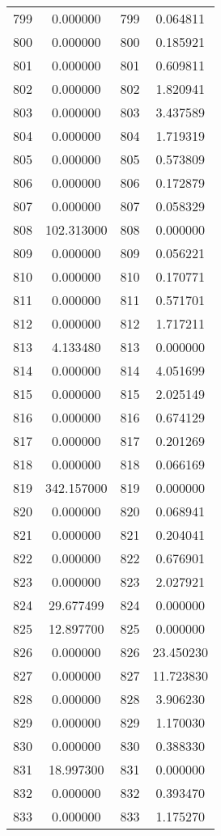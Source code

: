 \documentclass[12pt]{article}
\begin{document}
\begin{longtable}{@{}cccc@{}}
799 & 0.000000 & 799 & 0.064811 \\
800 & 0.000000 & 800 & 0.185921 \\
801 & 0.000000 & 801 & 0.609811 \\
802 & 0.000000 & 802 & 1.820941 \\
803 & 0.000000 & 803 & 3.437589 \\
804 & 0.000000 & 804 & 1.719319 \\
805 & 0.000000 & 805 & 0.573809 \\
806 & 0.000000 & 806 & 0.172879 \\
807 & 0.000000 & 807 & 0.058329 \\
808 & 102.313000 & 808 & 0.000000 \\
809 & 0.000000 & 809 & 0.056221 \\
810 & 0.000000 & 810 & 0.170771 \\
811 & 0.000000 & 811 & 0.571701 \\
812 & 0.000000 & 812 & 1.717211 \\
813 & 4.133480 & 813 & 0.000000 \\
814 & 0.000000 & 814 & 4.051699 \\
815 & 0.000000 & 815 & 2.025149 \\
816 & 0.000000 & 816 & 0.674129 \\
817 & 0.000000 & 817 & 0.201269 \\
818 & 0.000000 & 818 & 0.066169 \\
819 & 342.157000 & 819 & 0.000000 \\
820 & 0.000000 & 820 & 0.068941 \\
821 & 0.000000 & 821 & 0.204041 \\
822 & 0.000000 & 822 & 0.676901 \\
823 & 0.000000 & 823 & 2.027921 \\
824 & 29.677499 & 824 & 0.000000 \\
825 & 12.897700 & 825 & 0.000000 \\
826 & 0.000000 & 826 & 23.450230 \\
827 & 0.000000 & 827 & 11.723830 \\
828 & 0.000000 & 828 & 3.906230 \\
829 & 0.000000 & 829 & 1.170030 \\
830 & 0.000000 & 830 & 0.388330 \\
831 & 18.997300 & 831 & 0.000000 \\
832 & 0.000000 & 832 & 0.393470 \\
833 & 0.000000 & 833 & 1.175270 \\

\end{longtable}
\end{document}
